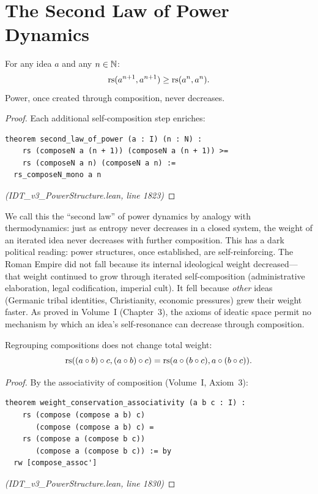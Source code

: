\section{The Second Law of Power Dynamics}

\begin{theorem}
\label{thm:second-law}
For any idea $a$ and any $n \in \mathbb{N}$:
\[
  \mathrm{rs}(a^{n+1}, a^{n+1}) \geq \mathrm{rs}(a^n, a^n).
\]
Power, once created through composition, never decreases.
\end{theorem}

\begin{proof}
Each additional self-composition step enriches:
\begin{lstlisting}
theorem second_law_of_power (a : I) (n : N) :
    rs (composeN a (n + 1)) (composeN a (n + 1)) >=
    rs (composeN a n) (composeN a n) :=
  rs_composeN_mono a n
\end{lstlisting}
\textit{(IDT\_v3\_PowerStructure.lean, line 1823)}
\end{proof}

\begin{interpretation}
We call this the ``second law'' of power dynamics by analogy with thermodynamics:
just as entropy never decreases in a closed system, the weight of an iterated
idea never decreases with further composition. This has a dark political reading:
power structures, once established, are self-reinforcing. The Roman Empire did
not fall because its internal ideological weight decreased---that weight continued
to grow through iterated self-composition (administrative elaboration, legal
codification, imperial cult). It fell because \emph{other} ideas (Germanic tribal
identities, Christianity, economic pressures) grew their weight faster. As
proved in Volume~I (Chapter~3), the axioms of ideatic space permit no mechanism
by which an idea's self-resonance can decrease through composition.
\end{interpretation}

\begin{theorem}
\label{thm:weight-conservation}
Regrouping compositions does not change total weight:
\[
  \mathrm{rs}((a \circ b) \circ c, (a \circ b) \circ c) = \mathrm{rs}(a \circ (b \circ c), a \circ (b \circ c)).
\]
\end{theorem}

\begin{proof}
By the associativity of composition (Volume~I, Axiom~3):
\begin{lstlisting}
theorem weight_conservation_associativity (a b c : I) :
    rs (compose (compose a b) c)
       (compose (compose a b) c) =
    rs (compose a (compose b c))
       (compose a (compose b c)) := by
  rw [compose_assoc']
\end{lstlisting}
\textit{(IDT\_v3\_PowerStructure.lean, line 1830)}
\end{proof}

